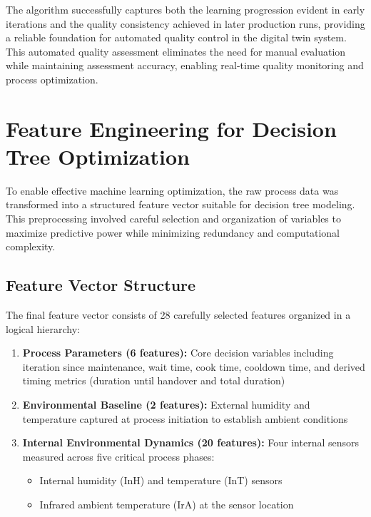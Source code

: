 The algorithm successfully captures both the learning progression evident in early iterations and the quality consistency achieved in later production runs, providing a reliable foundation for automated quality control in the digital twin system. This automated quality assessment eliminates the need for manual evaluation while maintaining assessment accuracy, enabling real-time quality monitoring and process optimization.


\section{Feature Engineering for Decision Tree Optimization}
\label{sec:feature-engineering}

To enable effective machine learning optimization, the raw process data was transformed into a structured feature vector suitable for decision tree modeling. This preprocessing involved careful selection and organization of variables to maximize predictive power while minimizing redundancy and computational complexity.

\subsection{Feature Vector Structure}

The final feature vector consists of 28 carefully selected features organized in a logical hierarchy:

\begin{enumerate}
    \item \textbf{Process Parameters (6 features):} Core decision variables including iteration since maintenance, wait time, cook time, cooldown time, and derived timing metrics (duration until handover and total duration)
    \item \textbf{Environmental Baseline (2 features):} External humidity and temperature captured at process initiation to establish ambient conditions
    \item \textbf{Internal Environmental Dynamics (20 features):} Four internal sensors measured across five critical process phases:
    \begin{itemize}
        \item Internal humidity (InH) and temperature (InT) sensors
        \item Infrared ambient temperature (IrA) at the sensor location
    \end{itemize}
\end{enumerate}

